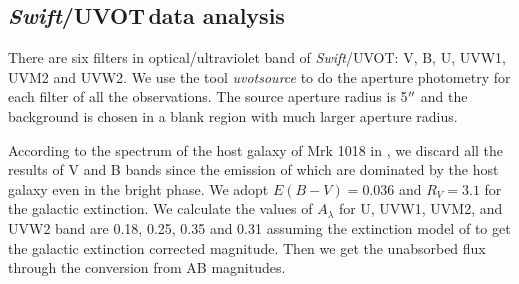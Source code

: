 \documentclass[twocolumn]{aastex63}
\newcommand{\uvot}{{\small {\it Swift}/UVOT}}
\begin{document}
\subsection{\uvot\,data analysis}
\label{sec:uvot}
There are six filters in optical/ultraviolet band of \uvot: V, B, U, UVW1, UVM2 and UVW2. We use the tool \textit{uvotsource} to do the aperture photometry for each filter of all the observations. The source aperture radius is 5$\mbox{$^{\prime\prime}$}$ and the background is chosen in a blank region with much larger aperture radius. 

According to the spectrum of the host galaxy of Mrk 1018 in \citep{2018MNRAS.480.3898N}, we discard all the results of V and B bands since the emission of which are dominated by the host galaxy even in the bright phase. We adopt $E(B-V) = 0.036$ \citep[see][]{2018MNRAS.480.3898N} and $R_{V}=3.1$ for the galactic extinction. We calculate the values of $A_{\lambda}$ for U, UVW1, UVM2, and UVW2 band are  0.18, 0.25, 0.35 and 0.31 assuming the extinction model of \citet{2007ApJ...663..320F} to get the galactic extinction corrected magnitude. Then we get the unabsorbed flux through the conversion from AB magnitudes. 


\end{document}
